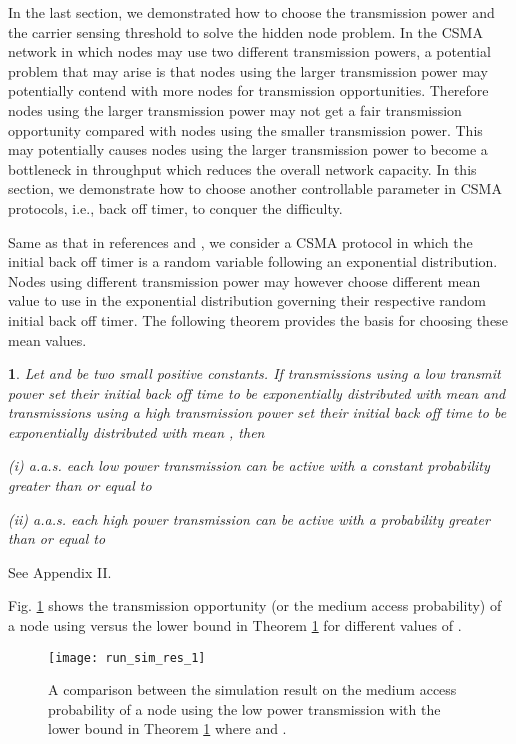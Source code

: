\documentclass[english]{IEEEtran}
\theoremstyle{plain}
\newtheorem{thm}{\protect\theoremname}
\theoremstyle{plain}
\theoremstyle{plain}
\theoremstyle{remark}
\providecommand{\theoremname}{Theorem}
\begin{document}
In the last section, we demonstrated how to choose the transmission
power and the carrier sensing threshold to solve the hidden node problem.
In the CSMA network in which nodes may use two different transmission
powers, a potential problem that may arise is that nodes using the
larger transmission power may potentially contend with more nodes
for transmission opportunities. Therefore nodes using the larger transmission
power may not get a fair transmission opportunity compared with nodes
using the smaller transmission power. This may potentially causes
nodes using the larger transmission power to become a bottleneck in
throughput which reduces the overall network capacity. In this section,
we demonstrate how to choose another controllable parameter in CSMA
protocols, i.e., back off timer, to conquer the difficulty.

Same as that in references \cite{Chau11Capacity} and \cite{Jiang10A},
we consider a CSMA protocol in which the initial back off timer is
a random variable following an exponential distribution. Nodes using
different transmission power may however choose different mean value
to use in the exponential distribution governing their respective
random initial back off timer. The following theorem provides the
basis for choosing these mean values.


\begin{thm}
\label{thm:medium access probability}Let  and 
be two small positive constants. If transmissions using a low transmit
power  set their initial back off time to be exponentially
distributed with mean  and transmissions using a high
transmission power  set their initial back off time to be
exponentially distributed with mean ,
then 

(i) a.a.s. each low power transmission can be active with a constant
probability greater than or equal to 



(ii) a.a.s. each high power transmission can be active with a probability
greater than or equal to 

\end{thm}
\begin{IEEEproof}
See Appendix II.
\end{IEEEproof}
Fig. \ref{fig:medium access probability} shows the transmission opportunity
(or the medium access probability) of a node using  versus
the lower bound in Theorem \ref{thm:medium access probability} for
different values of .

\begin{figure}
\begin{centering}
\texttt{[image: run\_sim\_res\_1]}
\par\end{centering}

\protect\caption{\label{fig:medium access probability}A comparison between the simulation
result on the medium access probability of a node using the low power
transmission with the lower bound in Theorem \ref{thm:medium access probability}
where  and . }
\end{figure}
\end{document}
